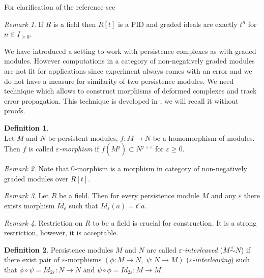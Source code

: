 \documentclass[a4paper, 12pt]{article}
\theoremstyle{definition}
\newtheorem{definition}{Definition}
\theoremstyle{remark}
\newtheorem{remark}{Remark}
\newcommand{\define}[1]{{\textit{#1}}}
\renewcommand{\geq}{\geqslant}
\begin{document}
For clarification of the reference see {\cite{Corbet18}}

\begin{remark}
  If $R$ is a field then $R[t]$ is a PID and graded ideals are exactly $t^n$ for $n \in I_{\geq 0}$.
\end{remark}


We have introduced a setting to work with persistence complexes as with graded modules. However computations in a category of non-negatively graded modules are not fit for applications since experiment always comes with an error and we do not have a measure for similarity of two persistence modules. We need technique which allows to construct morphisms of deformed complexes and track error propagation. This technique is developed in {\cite{GS16}}, we will recall it without proofs.

\begin{definition} {\cite[Definition 2.7]{GS16}}\\
  Let $M$ and $N$ be persistent modules, $f : M \to N$ be a homomorphism of modules. Then $f$ is called \define{$\varepsilon$-morphism} if $f(M^j) \subset N^{j+\varepsilon}$ for $\varepsilon \geq 0$.
\end{definition}

\begin{remark}
  Note that $0$-morphism is a morphism in category of non-negatively graded modules over $R[t]$.
\end{remark}

\begin{remark}
  Let $R$ be a field. Then for every persistence module $M$ and any $\varepsilon$ there exists morphism $Id_{\varepsilon}$ such that $Id_{\varepsilon}(a) = t^{\varepsilon}a$.
\end{remark}

\begin{remark}
  Restriction on $R$ to be a field is crucial for construction. It is a strong restriction, however, it is acceptable.
\end{remark}

\begin{definition}
  Persistence modules $M$ and $N$ are called \define{$\varepsilon$-interleaved} ($M \stackrel{\varepsilon}{\sim} N$) if there exist pair of $\varepsilon$-morphisms $(\phi : M \to N,\;\psi : N \to M)$ (\define{$\varepsilon$-interleaving}) such that $\phi \circ \psi = Id_{2\varepsilon} : N \to N$ and $\psi \circ \phi = Id_{2\varepsilon} : M \to M$.
\end{definition}
\end{document}
